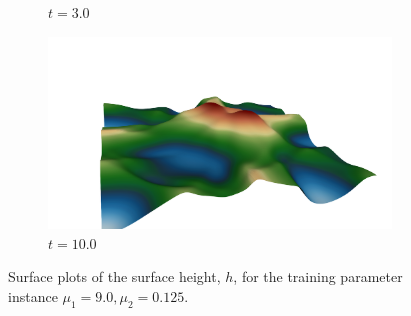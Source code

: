 \begin{figure}
\begin{center}
\begin{subfigure}[t]{0.49\textwidth}
\caption{$t=3.0$}
\end{subfigure}
\begin{subfigure}[t]{0.49\textwidth}
\includegraphics[trim={4cm 0cm 2cm 2cm},clip,width=1.0\linewidth]{figs/swe/h_t10.png}
\caption{$t=10.0$}
\end{subfigure}
\caption{Surface plots of the surface height, $h$, for the training parameter instance $\mu_1 = 9.0,\mu_2 = 0.125$.} 
\label{fig:fom_sols_swe}
\end{center}
\end{figure}


